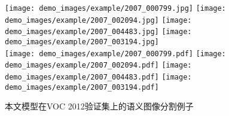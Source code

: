 \begin{figure}
	\centering
	\texttt{[image: demo\_images/example/2007\_000799.jpg]}
	\texttt{[image: demo\_images/example/2007\_002094.jpg]}
	\texttt{[image: demo\_images/example/2007\_004483.jpg]}
	\texttt{[image: demo\_images/example/2007\_003194.jpg]}
	\\
	\texttt{[image: demo\_images/example/2007\_000799.pdf]}
	\texttt{[image: demo\_images/example/2007\_002094.pdf]}
	\texttt{[image: demo\_images/example/2007\_004483.pdf]}
	\texttt{[image: demo\_images/example/2007\_003194.pdf]}
	\caption[语义图像分割的例子]{本文模型在VOC 2012验证集上的语义图像分割例子}
	\label{fig:example1}
\end{figure}